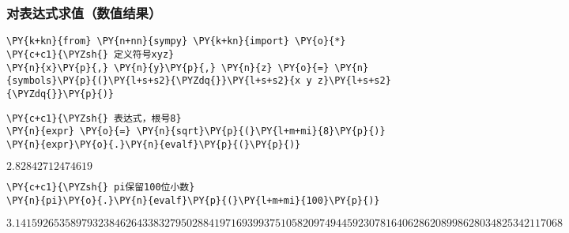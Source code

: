     \hypertarget{ux5bf9ux8868ux8fbeux5f0fux6c42ux503cux6570ux503cux7ed3ux679c}{%
\subsubsection{对表达式求值（数值结果）}\label{ux5bf9ux8868ux8fbeux5f0fux6c42ux503cux6570ux503cux7ed3ux679c}}

    \begin{tcolorbox}[breakable, size=fbox, boxrule=1pt, pad at break*=1mm,colback=cellbackground, colframe=cellborder]
\begin{Verbatim}[commandchars=\\\{\}]
\PY{k+kn}{from} \PY{n+nn}{sympy} \PY{k+kn}{import} \PY{o}{*}
\PY{c+c1}{\PYZsh{} 定义符号xyz}
\PY{n}{x}\PY{p}{,} \PY{n}{y}\PY{p}{,} \PY{n}{z} \PY{o}{=} \PY{n}{symbols}\PY{p}{(}\PY{l+s+s2}{\PYZdq{}}\PY{l+s+s2}{x y z}\PY{l+s+s2}{\PYZdq{}}\PY{p}{)}
\end{Verbatim}
\end{tcolorbox}

    \begin{tcolorbox}[breakable, size=fbox, boxrule=1pt, pad at break*=1mm,colback=cellbackground, colframe=cellborder]
\begin{Verbatim}[commandchars=\\\{\}]
\PY{c+c1}{\PYZsh{} 表达式，根号8}
\PY{n}{expr} \PY{o}{=} \PY{n}{sqrt}\PY{p}{(}\PY{l+m+mi}{8}\PY{p}{)}
\PY{n}{expr}\PY{o}{.}\PY{n}{evalf}\PY{p}{(}\PY{p}{)}
\end{Verbatim}
\end{tcolorbox}
 
            
    
    $\displaystyle 2.82842712474619$

    

    \begin{tcolorbox}[breakable, size=fbox, boxrule=1pt, pad at break*=1mm,colback=cellbackground, colframe=cellborder]
\begin{Verbatim}[commandchars=\\\{\}]
\PY{c+c1}{\PYZsh{} pi保留100位小数}
\PY{n}{pi}\PY{o}{.}\PY{n}{evalf}\PY{p}{(}\PY{l+m+mi}{100}\PY{p}{)}
\end{Verbatim}
\end{tcolorbox}
 
            
    
    $\displaystyle 3.141592653589793238462643383279502884197169399375105820974944592307816406286208998628034825342117068$

